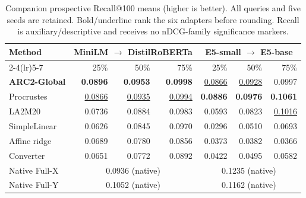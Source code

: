 \begin{table}[t]
\centering
\small
\setlength{\tabcolsep}{4pt}
\caption{Companion prospective Recall@100 means (higher is better). All queries and five seeds are retained. Bold/underline rank the six adapters before rounding. Recall is auxiliary/descriptive and receives no nDCG-family significance markers.}\label{tab:trec-recall}
\begin{tabular}{lrrrrrr}
\toprule
Method & \multicolumn{3}{c}{MiniLM $\rightarrow$ DistilRoBERTa} & \multicolumn{3}{c}{E5-small $\rightarrow$ E5-base} \\
\cmidrule(lr){2-4}\cmidrule(lr){5-7}
 & 25\% & 50\% & 75\% & 25\% & 50\% & 75\% \\
\midrule
\rowcolor{arcPale}\textbf{ARC2-Global} & \textbf{0.0896} & \textbf{0.0953} & \textbf{0.0998} & \underline{0.0866} & \underline{0.0928} & 0.0997 \\
Procrustes & \underline{0.0866} & \underline{0.0935} & \underline{0.0994} & \textbf{0.0886} & \textbf{0.0976} & \textbf{0.1061} \\
LA2M20 & 0.0736 & 0.0884 & 0.0983 & 0.0593 & 0.0823 & \underline{0.1016} \\
SimpleLinear & 0.0626 & 0.0845 & 0.0970 & 0.0296 & 0.0510 & 0.0693 \\
Affine ridge & 0.0689 & 0.0780 & 0.0856 & 0.0373 & 0.0382 & 0.0366 \\
Converter & 0.0651 & 0.0772 & 0.0892 & 0.0422 & 0.0495 & 0.0582 \\
\midrule
Native Full-X & \multicolumn{3}{c}{0.0936 (native)} & \multicolumn{3}{c}{0.1235 (native)} \\
Native Full-Y & \multicolumn{3}{c}{0.1052 (native)} & \multicolumn{3}{c}{0.1162 (native)} \\
\bottomrule
\end{tabular}
\end{table}
